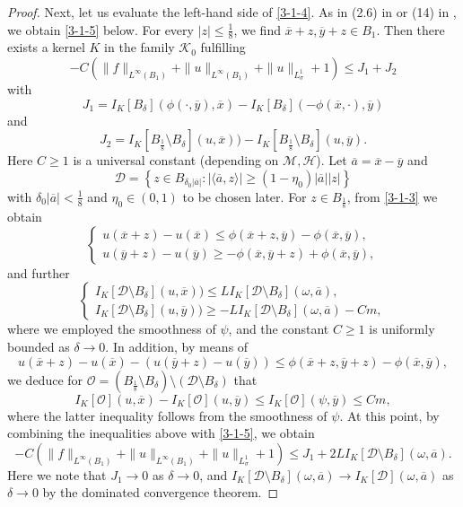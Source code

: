 \documentclass[11pt,reqno]{amsart}
\numberwithin{equation}{section}
\begin{document}
\begin{proof}
Next, let us evaluate the left-hand side of \eqref{3-1-4}. As in (2.6) in \cite{PT21} or (14) in \cite{APS24}, we obtain \eqref{3-1-5} below. For every $|z|\le\frac{1}{8}$, we find $\overline{x}+z,\overline{y}+z\in B_1$. Then there exists a kernel $K$ in the family $\mathcal{K}_0$ fulfilling
\begin{equation}
\label{3-1-5}
-C(\|f\|_{L^\infty(B_1)}+\|u\|_{L^\infty(B_1)}+\|u\|_{L^1_\sigma}+1)\le J_1+J_2
\end{equation}
with
$$
J_1=I_K[B_\delta](\phi(\cdot,\overline{y}),\overline{x})-I_K[B_\delta](-\phi(\overline{x},\cdot),\overline{y})
$$
and
$$
J_2=I_K[B_{\frac18}\setminus B_\delta](u,\overline{x}))-I_K[B_{\frac18}\setminus B_\delta](u,\overline{y}).
$$
Here $C\ge1$ is a universal constant (depending on $\mathcal{M},\mathcal{H}$).
Let $\overline{a}=\overline{x}-\overline{y}$ and
$$
\mathcal{D}=\left\{z\in B_{\delta_0|\overline{a}|}:|\langle\overline{a},z\rangle|\ge(1-\eta_0)|\overline{a}||z|\right\}
$$
with $\delta_0|\overline{a}|<\frac{1}{8}$ and $\eta_0\in(0,1)$ to be chosen later. For $z\in B_\frac{1}{8}$, from \eqref{3-1-3} we obtain
\begin{equation*}
\begin{cases}
u(\overline{x}+z)-u(\overline{x})\le \phi(\overline{x}+z,\overline{y})-\phi(\overline{x},\overline{y}),\\
u(\overline{y}+z)-u(\overline{y})\ge -\phi(\overline{x},\overline{y}+z)+\phi(\overline{x},\overline{y}),
\end{cases}
\end{equation*}
and further
\begin{equation*}
\begin{cases}
I_K[\mathcal{D}\setminus B_\delta](u,\overline{x}))\le LI_K[\mathcal{D}\setminus B_\delta](\omega,\overline{a}),\\
I_K[\mathcal{D}\setminus B_\delta](u,\overline{y}))\ge -LI_K[\mathcal{D}\setminus B_\delta](\omega,\overline{a})-Cm,
\end{cases}
\end{equation*}
where we employed the smoothness of $\psi$, and the constant $C\ge1$ is uniformly bounded as $\delta\rightarrow0$. In addition, by means of
$$
u(\overline{x}+z)-u(\overline{x})-(u(\overline{y}+z)-u(\overline{y}))\le \phi(\overline{x}+z,\overline{y}+z)-\phi(\overline{x},\overline{y}),
$$
we deduce for $\mathcal{O}=(B_{\frac18}\setminus B_\delta)\setminus(\mathcal{D}\setminus B_\delta)$ that
$$
I_K[\mathcal{O}](u,\overline{x})-I_K[\mathcal{O}](u,\overline{y})\le I_K[\mathcal{O}](\psi,\overline{y})\le Cm,
$$
where the latter inequality follows from the smoothness of $\psi$. At this point, by combining the inequalities above with \eqref{3-1-5}, we obtain
\begin{equation}
\label{3-1-6}
-C(\|f\|_{L^\infty(B_1)}+\|u\|_{L^\infty(B_1)}+\|u\|_{L^1_\sigma}+1)\le J_1+2LI_K[\mathcal{D}\setminus B_\delta](\omega,\overline{a}).
\end{equation}
Here we note that $J_1\rightarrow0$ as $\delta\rightarrow0$, and $I_K[\mathcal{D}\setminus B_\delta](\omega,\overline{a})\rightarrow I_K[\mathcal{D}](\omega,\overline{a})$ as $\delta\rightarrow0$
by the dominated convergence theorem.


\end{proof}
\end{document}
